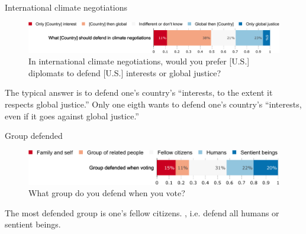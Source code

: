 \documentclass[aspectratio=169,xcolor=dvipsnames, 11pt,mathserif]{beamer}
\begin{document}
\begin{framefont}{\small}
\begin{frame}{International climate negotiations \hyperlink{donation}{}\label{negotiation}}
    \begin{figure}
        \centering 
        \caption{In international climate negotiations, would you prefer [U.S.] diplomats to defend [U.S.] interests or global justice?
        }
        \vspace{-.2cm}
        \includegraphics[width=\textwidth]{../figures/all/negotiation.pdf} 
    \end{figure}
	\bbvs \ip The typical answer is to defend one's country's ``interests, to the extent it respects global justice.''
    \ip Only one eigth wants to defend one's country's ``interests, even if it goes against global justice.''
    \ee
\end{frame}

\begin{frame}{Group defended \hyperlink{donation}{}\label{group_defended}}
    \begin{figure}
        \centering 
        \caption{What group do you defend when you vote?
        }
        \vspace{-.2cm}
        \includegraphics[width=\textwidth]{../figures/all/group_defended_agg2.pdf} 
    \end{figure}
	\bbvs \ip The most defended group is one's fellow citizens.
    \ip {}, i.e. defend all humans or sentient beings.
    \ee
\end{frame}


\end{framefont}
\end{document}

